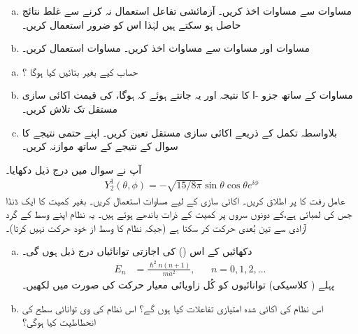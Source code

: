 \begin{enumerate}[a.]
\item
مساوات  سے مساوات  اخذ کریں۔ آزمائشی تفاعل استعمال نہ کرنے سے غلط نتائج حاصل ہو سکتے ہیں لہٰذا اس کو ضرور استعمال کریں۔ 
\item
مساوات  اور مساوات  سے مساوات  اخذ کریں۔  مساوات  استعمال کریں۔ 
\end{enumerate}
\begin{enumerate}[a.]
\item
حساب کیے بغیر بتائیں  کیا ہوگا ؟
\item
مساوات  کے ساتھ جزو -ا کا نتیجہ اور یہ جانتے ہوئے کہ  ہوگا،  کی قیمت اکائی سازی مستقل تک تلاش کریں۔ 
\item
بلاواسطہ تکمل کے ذریعے اکائی سازی مستقل تعین کریں۔ اپنے حتمی نتیجے کا سوال  کے نتیجے کے ساتھ موازنہ کریں۔ 
\end{enumerate} 
آپ نے سوال  میں درج ذیل دکھایا۔ 
\begin{align*} 
Y_2^1 (\theta , \phi) = - \sqrt{15/8 \pi} \sin \theta \cos \theta e^{i \phi}
\end{align*}
عامل رفت کا  پر اطلاق کریں۔ اکائی سازی کے لیے مساوات  استعمال کریں۔ 
بغیر کمیت کا ایک ڈنڈا جس کی لمبائی  ہے،کے دونوں سروں پر کمیت  کے ذرات باندھے ہوئے ہیں۔ یہ نظام اپنے وسط کے گرد آزادی سے تین بُعدی حرکت کر سکتا ہے (جبکہ نظام کا وسط از خود حرکت نہیں کرتا)۔ 
\begin{enumerate}[a.]
\item
دکھائیں کے اس  () کی اجازتی توانائیاں درج ذیل ہوں گی۔ 
\begin{align*}
E_n& = \frac{\hslash^2 n (n + 1)}{m a^2} ,&& n=0,1,2,\dotsc 
\end{align*}
 پہلے ( کلاسیکی) توانائیوں کو کُل زاویائی معیار حرکت کی صورت میں لکھیں۔ 
\item
اس نظام کی اکائی شدہ امتیازی تفاعلات کیا ہوں گے؟ اس نظام کی  وی توانائی سطح کی انحطاطیت کیا ہوگی؟ 
\end{enumerate}

